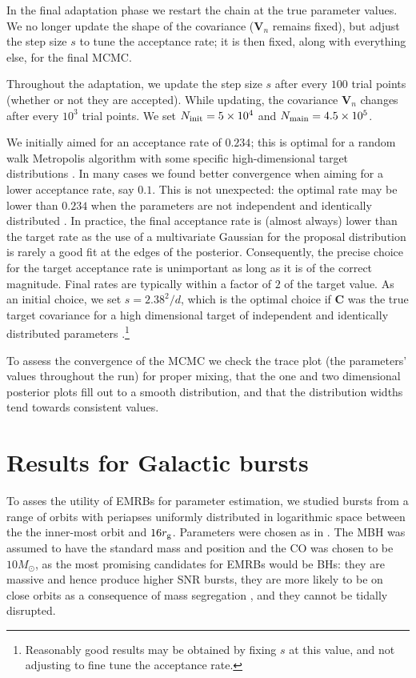 In the final adaptation phase we restart the chain at the true parameter values. We no longer update the shape of the covariance ($\boldsymbol{V}_n$ remains fixed), but adjust the step size $s$ to tune the acceptance rate; it is then fixed, along with everything else, for the final MCMC.

Throughout the adaptation, we update the step size $s$ after every $100$ trial points (whether or not they are accepted). While updating, the covariance $\boldsymbol{V}_n$ changes after every $10^3$ trial points. We set $N_\mathrm{init} = 5 \times 10^4$ and $N_\mathrm{main} = 4.5 \times 10^5$.

We initially aimed for an acceptance rate of $0.234$; this is optimal for a random walk Metropolis algorithm with some specific high-dimensional target distributions \citep{Roberts1997,Roberts2001}. In many cases we found better convergence when aiming for a lower acceptance rate, say $0.1$. This is not unexpected: the optimal rate may be lower than $0.234$ when the parameters are not independent and identically distributed \citep{Bedard2007, Bedard2008, Bedard2008a}. In practice, the final acceptance rate is (almost always) lower than the target rate as the use of a multivariate Gaussian for the proposal distribution is rarely a good fit at the edges of the posterior. Consequently, the precise choice for the target acceptance rate is unimportant as long as it is of the correct magnitude. Final rates are typically within a factor of $2$ of the target value. As an initial choice, we set $s = 2.38^2/d$, which is the optimal choice if $\boldsymbol{C}$ was the true target covariance for a high dimensional target of independent and identically distributed parameters \citep{Gelman1996,Roberts1997,Roberts2001,Haario2001}.\footnote{Reasonably good results may be obtained by fixing $s$ at this value, and not adjusting to fine tune the acceptance rate.}

To assess the convergence of the MCMC we check the trace plot (the parameters' values throughout the run) for proper mixing, that the one and two dimensional posterior plots fill out to a smooth distribution, and that the distribution widths tend towards consistent values.

\section{Results for Galactic bursts}\label{sec:Gal-Results}

To asses the utility of EMRBs for parameter estimation, we studied bursts from a range of orbits with periapses uniformly distributed in logarithmic space between the the inner-most orbit and $16 r_\mathrm{g}$. Parameters were chosen as in . The MBH was assumed to have the standard mass and position and the CO was chosen to be $10 M_\odot$, as the most promising candidates for EMRBs would be BHs: they are massive and hence produce higher SNR bursts, they are more likely to be on close orbits as a consequence of mass segregation \citep{Bahcall1977, Alexander2009}, and they cannot be tidally disrupted.

